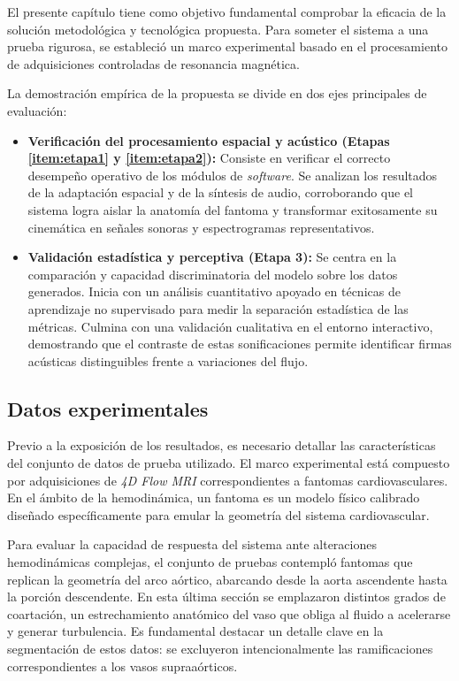 \label{ch:validacion}

El presente capítulo tiene como objetivo fundamental comprobar la eficacia de la solución metodológica y tecnológica propuesta. Para someter el sistema a una prueba rigurosa, se estableció un marco experimental basado en el procesamiento de adquisiciones controladas de resonancia magnética. 

La demostración empírica de la propuesta se divide en dos ejes principales de evaluación:

\begin{itemize}
    \item \textbf{Verificación del procesamiento espacial y acústico (Etapas \ref{item:etapa1} y \ref{item:etapa2}):} Consiste en verificar el correcto desempeño operativo de los módulos de \textit{software}. Se analizan los resultados de la adaptación espacial y de la síntesis de audio, corroborando que el sistema logra aislar la anatomía del fantoma y transformar exitosamente su cinemática en señales sonoras y espectrogramas representativos.

    
    \item \textbf{Validación estadística y perceptiva (Etapa 3):} Se centra en la comparación y capacidad discriminatoria del modelo sobre los datos generados. Inicia con un análisis cuantitativo apoyado en técnicas de aprendizaje no supervisado para medir la separación estadística de las métricas. Culmina con una validación cualitativa en el entorno interactivo, demostrando que el contraste de estas sonificaciones permite identificar firmas acústicas distinguibles frente a variaciones del flujo.
\end{itemize}


\subsection{Datos experimentales}

Previo a la exposición de los resultados, es necesario detallar las características del conjunto de datos de prueba utilizado. El marco experimental está compuesto por adquisiciones de \textit{4D Flow MRI} correspondientes a fantomas cardiovasculares. En el ámbito de la hemodinámica, un fantoma es un modelo físico calibrado diseñado específicamente para emular la geometría del sistema cardiovascular.

Para evaluar la capacidad de respuesta del sistema ante alteraciones hemodinámicas complejas, el conjunto de pruebas contempló fantomas que replican la geometría del arco aórtico, abarcando desde la aorta ascendente hasta la porción descendente. En esta última sección se emplazaron distintos grados de coartación, un estrechamiento anatómico del vaso que obliga al fluido a acelerarse y generar turbulencia. Es fundamental destacar un detalle clave en la segmentación de estos datos: se excluyeron intencionalmente las ramificaciones correspondientes a los vasos supraaórticos. 

